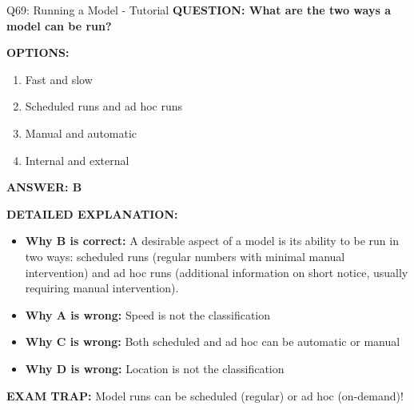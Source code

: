 \documentclass[8pt]{beamer}
\begin{document}
	\begin{frame}{Q69: Running a Model - Tutorial}
		\fontsize{6.5}{7.5}\selectfont
		\textbf{QUESTION: What are the two ways a model can be run?}
		
		\vspace{0.1cm}
		\textbf{OPTIONS:}
		\begin{enumerate}
			\item Fast and slow
			\item Scheduled runs and ad hoc runs
			\item Manual and automatic
			\item Internal and external
		\end{enumerate}
		
		\vspace{0.1cm}
		\textcolor{myblue}{\textbf{ANSWER: B}}
		
		\vspace{0.1cm}
		\textbf{DETAILED EXPLANATION:}
		\begin{itemize}
			\item \textbf{Why B is correct:} A desirable aspect of a model is its ability to be run in two ways: scheduled runs (regular numbers with minimal manual intervention) and ad hoc runs (additional information on short notice, usually requiring manual intervention).
			\item \textbf{Why A is wrong:} Speed is not the classification
			\item \textbf{Why C is wrong:} Both scheduled and ad hoc can be automatic or manual
			\item \textbf{Why D is wrong:} Location is not the classification
		\end{itemize}
		
		\textcolor{myred}{\textbf{EXAM TRAP:}} Model runs can be \textcolor{myblue}{scheduled (regular) or ad hoc (on-demand)}!
	\end{frame}
	
\end{document}
